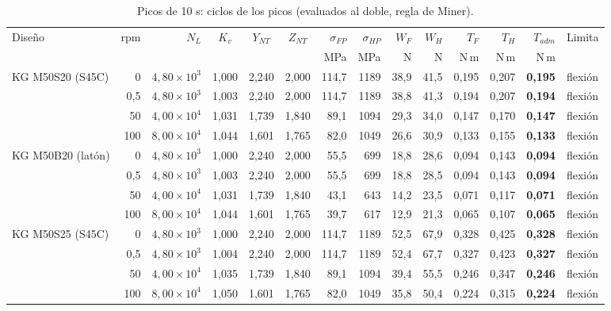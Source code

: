 \documentclass[11pt,a4paper]{article}
\begin{document}
\begin{table}[H]\centering\scriptsize\setlength{\tabcolsep}{2.8pt}\caption{Picos de 10 s: ciclos de los picos (evaluados al doble, regla de Miner).}\begin{tabular}{l r r c c c r r r r r r r l}
\toprule
Diseño & rpm & $N_L$ & $K_v$ & $Y_{NT}$ & $Z_{NT}$ & $\sigma_{FP}$ & $\sigma_{HP}$ & $W_F$ & $W_H$ & $T_F$ & $T_H$ & $T_{adm}$ & Limita\\
 & & & & & & MPa & MPa & N & N & N\,m & N\,m & N\,m & \\
\midrule
KG M50S20 (S45C) & 0 & $4{,}80\times10^{3}$ & 1,000 & 2,240 & 2,000 & 114,7 & 1189 & 38,9 & 41,5 & 0,195 & 0,207 & \textbf{0,195} & flexión \\
 & 0,5 & $4{,}80\times10^{3}$ & 1,003 & 2,240 & 2,000 & 114,7 & 1189 & 38,8 & 41,3 & 0,194 & 0,207 & \textbf{0,194} & flexión \\
 & 50 & $4{,}00\times10^{4}$ & 1,031 & 1,739 & 1,840 & 89,1 & 1094 & 29,3 & 34,0 & 0,147 & 0,170 & \textbf{0,147} & flexión \\
 & 100 & $8{,}00\times10^{4}$ & 1,044 & 1,601 & 1,765 & 82,0 & 1049 & 26,6 & 30,9 & 0,133 & 0,155 & \textbf{0,133} & flexión \\
\addlinespace[2pt]
KG M50B20 (latón) & 0 & $4{,}80\times10^{3}$ & 1,000 & 2,240 & 2,000 & 55,5 & 699 & 18,8 & 28,6 & 0,094 & 0,143 & \textbf{0,094} & flexión \\
 & 0,5 & $4{,}80\times10^{3}$ & 1,003 & 2,240 & 2,000 & 55,5 & 699 & 18,8 & 28,5 & 0,094 & 0,143 & \textbf{0,094} & flexión \\
 & 50 & $4{,}00\times10^{4}$ & 1,031 & 1,739 & 1,840 & 43,1 & 643 & 14,2 & 23,5 & 0,071 & 0,117 & \textbf{0,071} & flexión \\
 & 100 & $8{,}00\times10^{4}$ & 1,044 & 1,601 & 1,765 & 39,7 & 617 & 12,9 & 21,3 & 0,065 & 0,107 & \textbf{0,065} & flexión \\
\addlinespace[2pt]
KG M50S25 (S45C) & 0 & $4{,}80\times10^{3}$ & 1,000 & 2,240 & 2,000 & 114,7 & 1189 & 52,5 & 67,9 & 0,328 & 0,425 & \textbf{0,328} & flexión \\
 & 0,5 & $4{,}80\times10^{3}$ & 1,004 & 2,240 & 2,000 & 114,7 & 1189 & 52,4 & 67,7 & 0,327 & 0,423 & \textbf{0,327} & flexión \\
 & 50 & $4{,}00\times10^{4}$ & 1,035 & 1,739 & 1,840 & 89,1 & 1094 & 39,4 & 55,5 & 0,246 & 0,347 & \textbf{0,246} & flexión \\
 & 100 & $8{,}00\times10^{4}$ & 1,050 & 1,601 & 1,765 & 82,0 & 1049 & 35,8 & 50,4 & 0,224 & 0,315 & \textbf{0,224} & flexión \\

\end{tabular}
\end{table}
\end{document}
